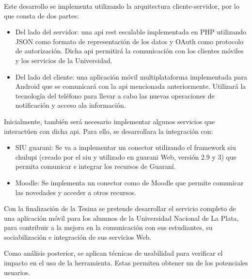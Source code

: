 Este desarrollo se implementa utilizando la arquitectura cliente-servidor, por lo que consta de dos partes:
\begin{itemize}
	\item Del lado del servidor: una \gls{api} \gls{rest} escalable implementada en PHP utilizando JSON como formato de representación de los datos y OAuth como protocolo de autorización. Dicha \gls{api} permitirá la comunicación con los clientes móviles y los servicios de la Universidad.
	\item Del lado del cliente: una aplicación móvil multiplataforma implementada para Android que se comunicará con la \gls{api} mencionada anteriormente. Utilizará la tecnología del teléfono para llevar a cabo las nuevas operaciones de notificación y acceso ala información.
\end{itemize}

Inicialmente, también será necesario implementar algunos servicios que interactúen con dicha \gls{api}. Para ello, se desarrollara la integración con:
\begin{itemize}
	\item SIU \gls{guarani}: Se va a implementar un conector utilizando el \gls{framework} \gls{siu} \gls{chulupi} (creado por el \gls{siu} y utilizado en \gls{guarani} Web, versión 2.9 y 3) que permita comunicar e integrar los recursos de Guaraní.
	\item Moodle: Se implementa un conector como  de Moodle que permite comunicar las novedades y acceder a otros recursos.
\end{itemize}

Con la finalización de la Tesina se pretende desarrollar el servicio completo de una aplicación móvil para los alumnos de la Universidad Nacional de La Plata, para contribuir a la mejora en la comunicación con sus estudiantes, su sociabilización e integración de sus servicios Web.

Como análisis posterior, se aplican técnicas de usabilidad para verificar el impacto en el uso de la herramienta. Estas permiten obtener un  de los potenciales usuarios.

